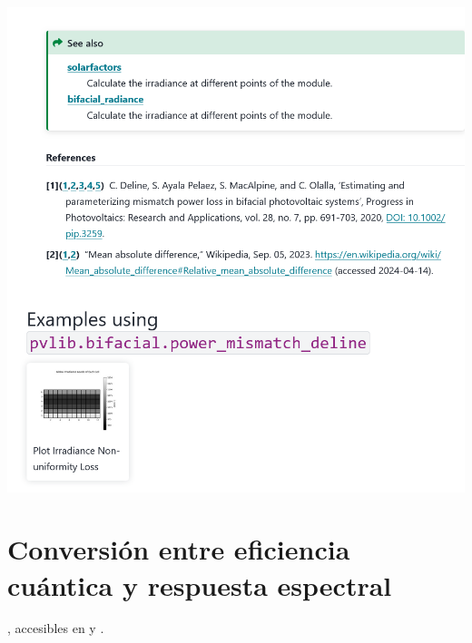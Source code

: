 \begin{myparindent}{0pt}
\includegraphics[width=\linewidth,height=0.9\textheight,keepaspectratio]{images/docs_funcs_cut/power_mismatch_deline_2.png}

\newpage\section{Conversión entre eficiencia cuántica y respuesta espectral} \label{sct:doc_sr_eq}

, accesibles en  y .


\end{myparindent}
